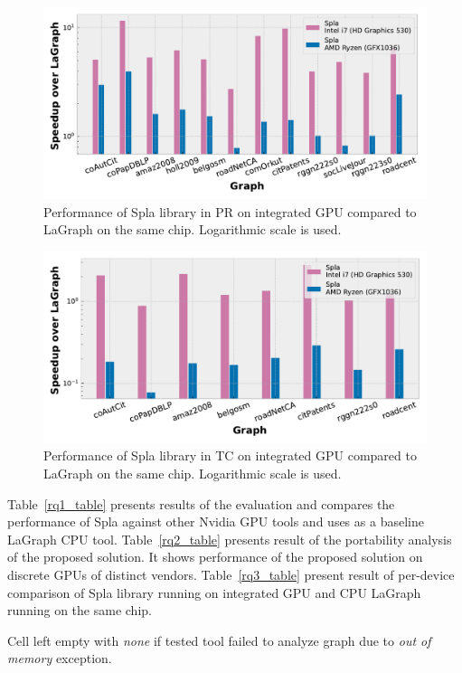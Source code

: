 \begin{figure}[tbp]
\centering
\includegraphics[width=0.9\linewidth]{plots/rq3_int_pr.pdf}
\caption{Performance of Spla library in PR on integrated GPU compared to LaGraph on the same chip. Logarithmic scale is used.}
\label{fig:rq3_pr}
\end{figure}

\begin{figure}[tbp]
\centering
\includegraphics[width=0.9\linewidth]{plots/rq3_int_tc.pdf}
\caption{Performance of Spla library in TC on integrated GPU compared to LaGraph on the same chip. Logarithmic scale is used.}
\label{fig:rq3_tc}
\end{figure}

Table~\ref{rq1_table} presents results of the evaluation and compares the performance of Spla against other Nvidia GPU tools and uses as a baseline LaGraph CPU tool. 
Table~\ref{rq2_table} presents result of the portability analysis of the proposed solution. It shows performance of the proposed solution on discrete GPUs of distinct vendors.
Table~\ref{rq3_table} present result of per-device comparison of Spla library running on integrated GPU and CPU LaGraph running on the same chip.

Cell left empty with \textit{none} if tested tool failed to analyze graph due to \textit{out of memory} exception.\\

